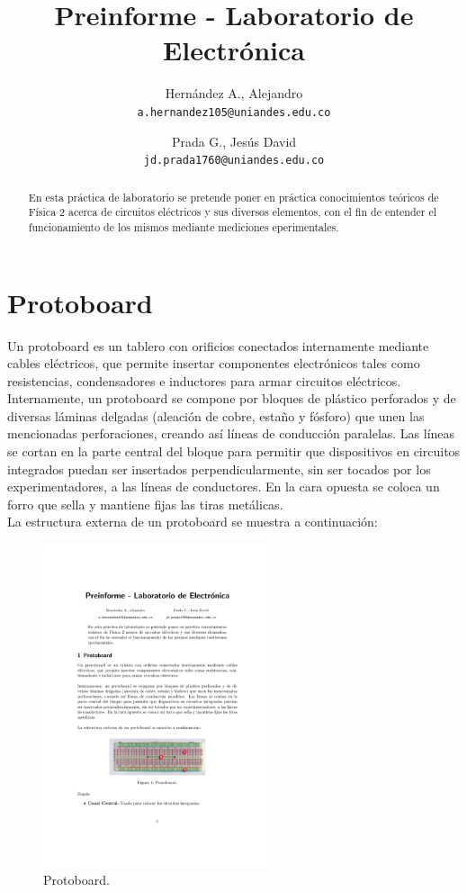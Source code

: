 \documentclass{scrartcl}
\title{Preinforme - Laboratorio de Electrónica}
\author{
	\footnotesize Hernández A., Alejandro\\
	\footnotesize \texttt{a.hernandez105@uniandes.edu.co}
	\and
	\footnotesize Prada G., Jesús David\\
	\footnotesize \texttt{jd.prada1760@uniandes.edu.co}
       }
\date{\vspace{-5ex}}
\begin{document}
\maketitle

\begin{abstract}
\noindent
En esta práctica de laboratorio se pretende poner en práctica conocimientos teóricos de Física 2 acerca de circuitos eléctricos y sus diversos elementos, con el fin de entender el funcionamiento de los mismos mediante mediciones eperimentales. 
\end{abstract}

\section{Protoboard}

Un protoboard es un tablero con orificios conectados internamente mediante cables eléctricos, que permite insertar componentes electrónicos tales como resistencias, condensadores e inductores para armar circuitos eléctricos.
\\

Internamente, un protoboard se compone por bloques de plástico perforados y de diversas láminas delgadas (aleación de cobre, estaño y fósforo) que unen las mencionadas perforaciones, creando así líneas de conducción paralelas. Las líneas se cortan en la parte central del bloque para permitir que dispositivos en circuitos integrados puedan ser insertados perpendicularmente, sin ser tocados por los experimentadores, a las líneas de conductores. En la cara opuesta se coloca un forro que sella y mantiene fijas las tiras metálicas.
\\

La estructura externa de un protoboard se muestra a continuación:
\\

\begin{figure}[h!]
	\centering
	\includegraphics[width=0.6\textwidth]{protoboard}
	\caption{Protoboard.}
\end{figure}
\end{document}
